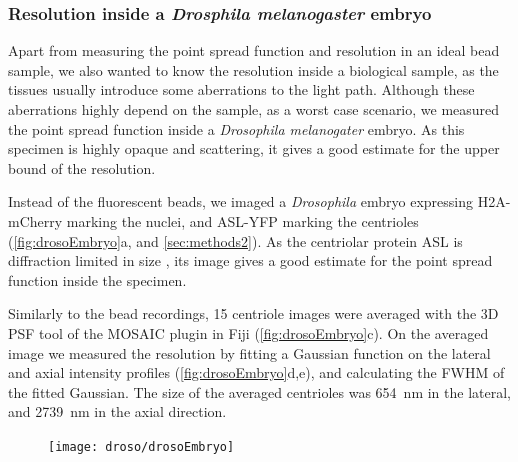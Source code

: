   \subsubsection{Resolution inside a \textit{Drosphila melanogaster} embryo}

    Apart from measuring the point spread function and resolution in an ideal bead sample, we also wanted to know the resolution inside a biological sample, as the tissues usually introduce some aberrations to the light path. Although these aberrations highly depend on the sample, as a worst case scenario, we measured the point spread function inside a \textit{Drosophila melanogater} embryo. As this specimen is highly opaque and scattering, it gives a good estimate for the upper bound of the resolution.

    Instead of the fluorescent beads, we imaged a \textit{Drosophila} embryo expressing H2A-mCherry marking the nuclei, and ASL-YFP marking the centrioles (\autoref{fig:drosoEmbryo}a, and \autoref{sec:methods2}). As the centriolar protein ASL is diffraction limited in size \cite{gonczy_towards_2012}, its image gives a good estimate for the point spread function inside the specimen.

    Similarly to the bead recordings, 15 centriole images were averaged with the 3D PSF tool of the MOSAIC plugin in Fiji (\autoref{fig:drosoEmbryo}c). On the averaged image we measured the resolution by fitting a Gaussian function on the lateral and axial intensity profiles (\autoref{fig:drosoEmbryo}d,e), and calculating the FWHM of the fitted Gaussian. The size of the averaged centrioles was \SI{654}{nm} in the lateral, and \SI{2739}{nm} in the axial direction.

    \begin{figure}[ptb]
      \centering
      \texttt{[image: droso/drosoEmbryo]}
      \label{fig:drosoEmbryo}
    \end{figure}
    
